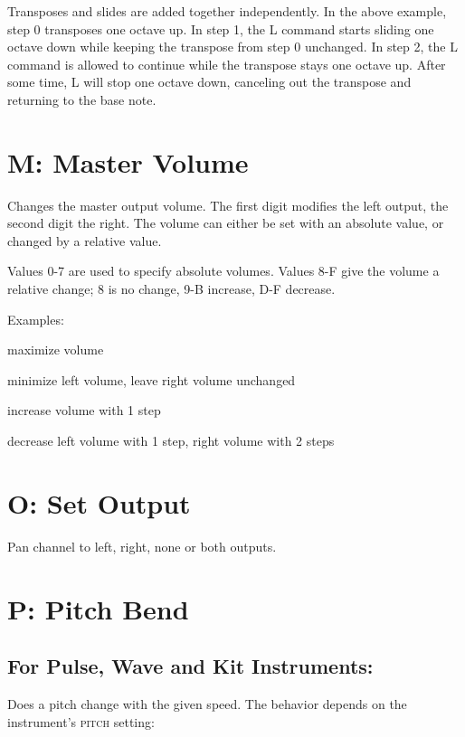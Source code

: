 Transposes and slides are added together independently. In the above example, step 0 transposes one octave up. In step 1, the L command starts sliding one octave down while keeping the transpose from step 0 unchanged. In step 2, the L command is allowed to continue while the transpose stays one octave up. After some time, L will stop one octave down, canceling out the transpose and returning to the base note.

\section{M: Master Volume}

Changes the master output volume. The first digit modifies the left output, the second digit the right. The volume can either be set with an absolute value, or changed by a relative value.

Values 0-7 are used to specify absolute volumes. Values 8-F give the volume a relative change; 8 is no change, 9-B increase, D-F decrease.

\begin{description}
\item Examples:
\item[M77] maximize volume
\item[M08] minimize left volume, leave right volume unchanged
\item[M99] increase volume with 1 step
\item[MFE] decrease left volume with 1 step, right volume with 2 steps
\end{description}

\section{O: Set Output}

Pan channel to left, right, none or both outputs.

\section{P: Pitch Bend}

\subsection{For Pulse, Wave and Kit Instruments:}

Does a pitch change with the given speed. The behavior depends on the instrument's \textsc{pitch} setting:

